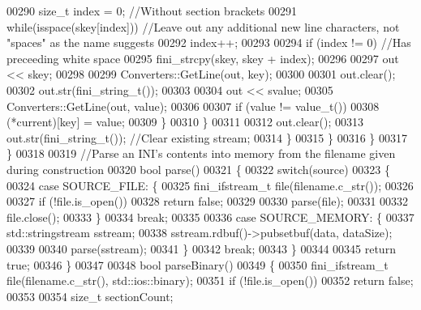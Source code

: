 \begin{DoxyCode}
00290                      \textcolor{keywordtype}{size\_t} index = 0;  \textcolor{comment}{//Without section brackets}
00291                      \textcolor{keywordflow}{while}(isspace(skey[index]))  \textcolor{comment}{//Leave out any additional new line characters, not
       "spaces" as the name suggests}
00292                         index++;
00293 
00294                      \textcolor{keywordflow}{if} (index != 0)  \textcolor{comment}{//Has preceeding white space}
00295                         fini_strcpy(skey, skey + index);
00296 
00297                      out << skey;
00298 
00299                      Converters::GetLine(out, key);
00300 
00301                      out.clear();
00302                      out.str(fini_string_t());
00303 
00304                      out << svalue;
00305                      Converters::GetLine(out, value);
00306 
00307                      \textcolor{keywordflow}{if} (value != value\_t())
00308                        (*current)[key] = value;
00309                   \}
00310                \}
00311 
00312                out.clear();
00313                out.str(fini_string_t()); \textcolor{comment}{//Clear existing stream;}
00314             \}
00315          \}
00316       \}
00317    \}
00318 
00319    \textcolor{comment}{//Parse an INI's contents into memory from the filename given during construction}
00320    \textcolor{keywordtype}{bool} parse()
00321    \{
00322       \textcolor{keywordflow}{switch}(source)
00323       \{
00324       \textcolor{keywordflow}{case} SOURCE\_FILE: \{
00325             fini_ifstream_t file(filename.c\_str());
00326 
00327             \textcolor{keywordflow}{if} (!file.is\_open())
00328                \textcolor{keywordflow}{return} \textcolor{keyword}{false};
00329 
00330             parse(file);
00331 
00332             file.close();
00333          \}
00334          \textcolor{keywordflow}{break};
00335 
00336       \textcolor{keywordflow}{case} SOURCE\_MEMORY: \{
00337             std::stringstream sstream;
00338             sstream.rdbuf()->pubsetbuf(data, dataSize);
00339 
00340             parse(sstream);
00341          \}
00342          \textcolor{keywordflow}{break};
00343       \}
00344 
00345       \textcolor{keywordflow}{return} \textcolor{keyword}{true};
00346    \}
00347 
00348    \textcolor{keywordtype}{bool} parseBinary()
00349    \{
00350       fini_ifstream_t file(filename.c\_str(), std::ios::binary);
00351       \textcolor{keywordflow}{if} (!file.is\_open())
00352          \textcolor{keywordflow}{return} \textcolor{keyword}{false};
00353 
00354       \textcolor{keywordtype}{size\_t} sectionCount;

\end{DoxyCode}
